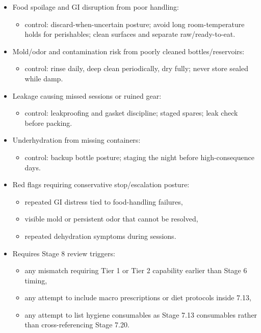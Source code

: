 \documentclass[10pt]{article}
\begin{document}
\begin{itemize}
\item Food spoilage and GI disruption from poor handling:
  \begin{itemize}
  \item control: discard-when-uncertain posture; avoid long room-temperature holds for perishables; clean surfaces and separate raw/ready-to-eat.
  \end{itemize}
\item Mold/odor and contamination risk from poorly cleaned bottles/reservoirs:
  \begin{itemize}
  \item control: rinse daily, deep clean periodically, dry fully; never store sealed while damp.
  \end{itemize}
\item Leakage causing missed sessions or ruined gear:
  \begin{itemize}
  \item control: leakproofing and gasket discipline; staged spares; leak check before packing.
  \end{itemize}
\item Underhydration from missing containers:
  \begin{itemize}
  \item control: backup bottle posture; staging the night before high-consequence days.
  \end{itemize}
\item Red flags requiring conservative stop/escalation posture:
  \begin{itemize}
  \item repeated GI distress tied to food-handling failures,
  \item visible mold or persistent odor that cannot be resolved,
  \item repeated dehydration symptoms during sessions.
  \end{itemize}
\item Requires Stage 8 review triggers:
  \begin{itemize}
  \item any mismatch requiring Tier 1 or Tier 2 capability earlier than Stage 6 timing,
  \item any attempt to include macro prescriptions or diet protocols inside 7.13,
  \item any attempt to list hygiene consumables as Stage 7.13 consumables rather than cross-referencing Stage 7.20.
  \end{itemize}
\end{itemize}
\end{document}

